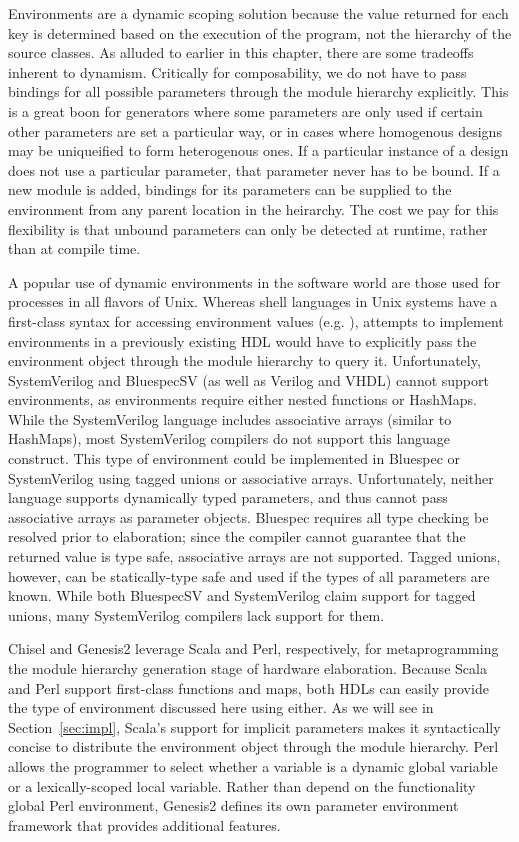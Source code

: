 Environments are a dynamic scoping solution because the value returned for each key is determined based on the execution of the program,
not the hierarchy of the source classes.
As alluded to earlier in this chapter, there are some tradeoffs inherent to dynamism.
Critically for composability, we do not have to pass bindings for all possible parameters through the module hierarchy explicitly.
This is a great boon for generators where some parameters are only used if certain other parameters are set a particular way,
or in cases where homogenous designs may be uniqueified to form heterogenous ones.
If a particular instance of a design does not use a particular parameter, that parameter never has to be bound.
If a new module is added, bindings for its parameters can be supplied to the environment from any parent location in the heirarchy.
The cost we pay for this flexibility is that unbound parameters can only be detected at runtime, rather than at compile time.

A popular use of dynamic environments in the software world are those used for processes in all flavors of Unix.
Whereas shell languages in Unix systems have a first-class syntax for accessing environment values (e.g. ),
attempts to implement environments in a previously existing HDL would have to explicitly pass the environment object through the module hierarchy to query it.
Unfortunately, SystemVerilog and BluespecSV (as well as Verilog and VHDL) cannot support environments, as environments require either nested functions or HashMaps.
While the SystemVerilog language includes associative arrays (similar to HashMaps), most SystemVerilog compilers do not support this language construct. 
This type of environment could be implemented in Bluespec or SystemVerilog using tagged unions or associative arrays.
Unfortunately, neither language supports dynamically typed parameters, and thus cannot pass associative arrays as parameter objects.
Bluespec requires all type checking be resolved prior to elaboration; since the compiler cannot guarantee that the returned value is type safe, associative arrays are not supported. 
Tagged unions, however, can be statically-type safe and used if the types of all parameters are known.
While both BluespecSV and SystemVerilog claim support for tagged unions, many SystemVerilog compilers lack support for them.

Chisel and Genesis2 leverage Scala and Perl, respectively, for metaprogramming the module hierarchy generation stage of hardware elaboration.
Because Scala and Perl support first-class functions and maps, both HDLs can easily provide the type of environment discussed here using either.
As we will see in Section~\ref{sec:impl}, Scala's support for implicit parameters makes it syntactically concise to distribute
the environment object through the module hierarchy.
Perl allows the programmer to select whether a variable is a dynamic global variable or a lexically-scoped local variable.
Rather than depend on the functionality global Perl environment, Genesis2 defines its own parameter environment framework that provides additional features.

